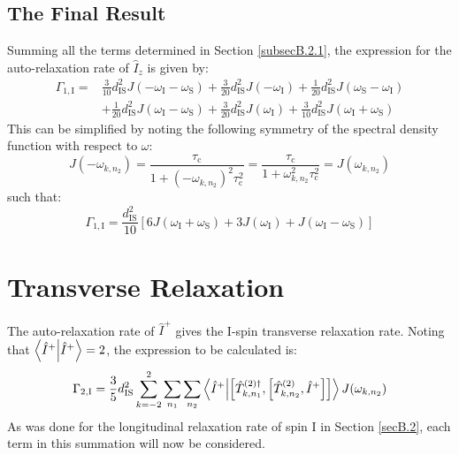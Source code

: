 \begin{appendixtext}
\subsection{The Final Result} \label{subsecB.2.2}
Summing all the terms determined in Section \ref{subsecB.2.1}, the expression for the auto-relaxation rate of $\hat{I}_z$ is given by:
\begin{equation}
\label{eqB.3}
\begin{split}
\Gamma_{1,\text{I}} = &\frac{3}{10} d_{\text{IS}}^2 J(-\omega_{\text{I}} - \omega_{\text{S}}) + \frac{3}{20} d_{\text{IS}}^2 J(- \omega_{\text{I}}) + \frac{1}{20} d_{\text{IS}}^2 J(\omega_{\text{S}} - \omega_{\text{I}}) \\ 
&+ \frac{1}{20} d_{\text{IS}}^2 J(\omega_{\text{I}} - \omega_{\text{S}}) + \frac{3}{20} d_{\text{IS}}^2 J(\omega_{\text{I}}) + \frac{3}{10} d_{\text{IS}}^2 J(\omega_{\text{I}} + \omega_{\text{S}})
\end{split}
\end{equation}
This can be simplified by noting the following symmetry of the spectral density function with respect to $\omega$:
\begin{equation}
\label{eqB.4}
J(- \omega_{k,n_2}) = \frac{\tau_{\text{c}}}{1 + \left(- \omega_{k,n_2}\right)^2 \tau_{\text{c}}^2} = \frac{\tau_{\text{c}}}{1 + \omega_{k,n_2}^2 \tau_{\text{c}}^2} = J(\omega_{k,n_2})
\end{equation}
such that:
\begin{equation}
\label{eqB.5}
\Gamma_{1,\text{I}} = \frac{d_{\text{IS}}^2}{10} \left[ 6 J(\omega_{\text{I}} + \omega_{\text{S}}) + 3 J(\omega_{\text{I}}) + J(\omega_{\text{I}} - \omega_{\text{S}})\right]
\end{equation}
\section{Transverse Relaxation}\label{secB.3}
The auto-relaxation rate of $\hat{I}^+$ gives the I-spin transverse relaxation rate. Noting that $\bra{\hat{I}^+} \ket{\hat{I}^+} = 2$, the expression to be calculated is:
\begin{equation}
\label{eqB.6}
\Gamma_{2,\text{I}} = \frac{3}{5} d_{\text{IS}}^2 \sum \limits_{k = -2}^2 \sum \limits_{n_1} \sum \limits_{n_2} \bra{\hat{I}^+} \ket{\comm{\hat{T}_{k, n_1}^{(2) \dagger}}{\comm{\hat{T}_{k,n_2}^{(2)}}{\hat{I}^+}}} J(\omega_{k,n_2})
\end{equation}
As was done for the longitudinal relaxation rate of spin I in Section \ref{secB.2}, each term in this summation will now be considered.

\end{appendixtext}
